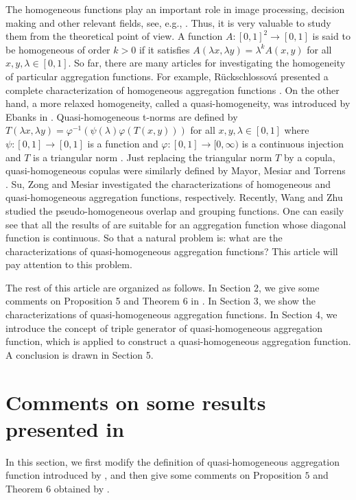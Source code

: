 \documentclass[12pt]{article}
\begin{document}
The homogeneous functions play an important role in image processing, decision making and other relevant fields, see, e.g., \cite{Cabrera2014,Jurio2013, Jurio2014}. Thus, it is very valuable to study them from the theoretical point of view. A function $A:[0, 1]^2\rightarrow[0, 1]$ is said to be homogeneous of order $k>0$ if it satisfies $A(\lambda x, \lambda y) =\lambda^{k}A(x, y)$ for all $ x, y, \lambda\in[0, 1]$. So far, there are many articles for investigating the homogeneity of particular aggregation functions. For example, R\"{u}ckschlossov\'{a} presented a complete characterization of homogeneous aggregation functions \cite{T2005}. On the other hand, a more relaxed homogeneity, called a quasi-homogeneity, was introduced by Ebanks in \cite{Ebanks1998}. Quasi-homogeneous t-norms are defined by $T(\lambda x, \lambda y) =\varphi^{-1}(\psi(\lambda)\varphi(T(x, y)))$ for all $ x, y, \lambda\in[0, 1]$ where $\psi:[0, 1] \rightarrow[0, 1]$ is a function and $\varphi:[0, 1] \rightarrow[0, \infty)$ is a continuous injection and $T$ is a triangular norm \cite {Ebanks1998}. Just replacing the triangular norm $T$ by a copula, quasi-homogeneous copulas were similarly defined by Mayor, Mesiar and Torrens \cite{Mayor2008}. Su, Zong and Mesiar \cite{Su2022} investigated the characterizations of homogeneous and quasi-homogeneous aggregation functions, respectively. Recently, Wang and Zhu \cite{Zhu} studied the pseudo-homogeneous overlap and grouping functions. One can easily see that all the results of \cite{Su2022,Zhu} are suitable for an aggregation function whose diagonal function is continuous. So that a natural problem is: what are the characterizations of quasi-homogeneous aggregation functions? This article will pay attention to this problem.

The rest of this article are organized as follows. In Section 2, we give some comments on Proposition 5 and Theorem 6 in \cite{Su2022}. In Section 3, we show the characterizations of quasi-homogeneous aggregation functions. In Section 4, we introduce the concept of triple generator of quasi-homogeneous aggregation function, which is applied to construct a quasi-homogeneous aggregation function. A conclusion is drawn in Section 5.


\section{Comments on some results presented in \cite{Su2022}}

In this section, we first modify the definition of quasi-homogeneous aggregation function introduced by \cite {Su2022}, and then give some comments on Proposition $5$ and Theorem $6$ obtained by \cite{Su2022}.
\end{document}
